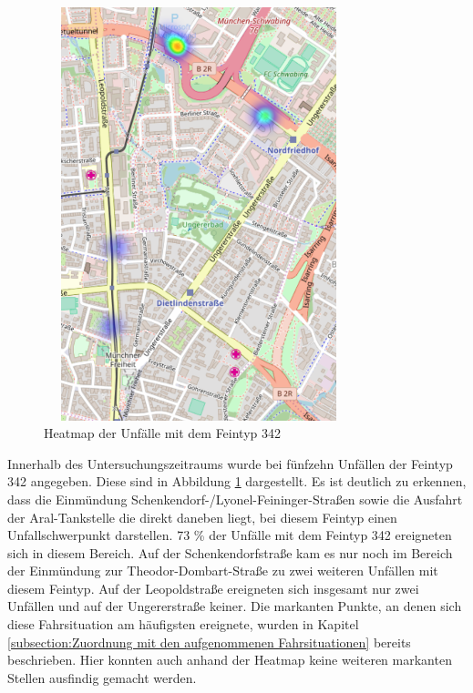 \begin{savenotes}
	\begin{figure}[H]
		\centering
		\includegraphics[width=9cm,height=12cm]{figures/HM_342}
		\caption[Heatmap der Unfälle mit dem Feintyp 342]{Heatmap der Unfälle mit dem Feintyp 342}\label{fig:Heatmap_342}
	\end{figure}
\end{savenotes}

Innerhalb des Untersuchungszeitraums wurde bei fünfzehn Unfällen der Feintyp 342 angegeben. Diese sind in Abbildung \ref{fig:Heatmap_342} dargestellt. Es ist deutlich zu erkennen, dass die Einmündung Schenkendorf-/Lyonel-Feininger-Straßen sowie die Ausfahrt der Aral-Tankstelle die direkt daneben liegt, bei diesem Feintyp einen Unfallschwerpunkt darstellen. 73 \% der Unfälle mit dem Feintyp 342 ereigneten sich in diesem Bereich. Auf der Schenkendorfstraße kam es nur noch im Bereich der Einmündung zur Theodor-Dombart-Straße zu zwei weiteren Unfällen mit diesem Feintyp. Auf der Leopoldstraße ereigneten sich insgesamt nur zwei Unfällen und auf der Ungererstraße keiner. Die markanten Punkte, an denen sich diese Fahrsituation am häufigsten ereignete, wurden in Kapitel \ref{subsection:Zuordnung mit den aufgenommenen Fahrsituationen} bereits beschrieben. Hier konnten auch anhand der Heatmap keine weiteren markanten Stellen ausfindig gemacht werden.

